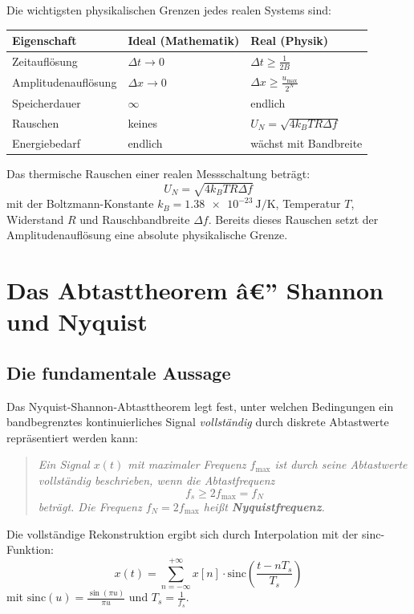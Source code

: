 ﻿\documentclass[12pt,a4paper,titlepage]{report}
\begin{document}
Die wichtigsten physikalischen Grenzen jedes realen Systems sind:

\begin{center}
\begin{tabular}{lll}
\toprule
\textbf{Eigenschaft} & \textbf{Ideal (Mathematik)} & \textbf{Real (Physik)} \\
\midrule
Zeitauflösung & $\Delta t \to 0$ & $\Delta t \geq \frac{1}{2B}$ \\
Amplitudenauflösung & $\Delta x \to 0$ & $\Delta x \geq \frac{u_{\max}}{2^N}$ \\
Speicherdauer & $\infty$ & endlich \\
Rauschen & keines & $U_N = \sqrt{4k_B T R \Delta f}$ \\
Energiebedarf & endlich & wächst mit Bandbreite \\
\bottomrule
\end{tabular}
\end{center}

Das thermische Rauschen einer realen Messschaltung beträgt:
\[
	U_N = \sqrt{4 k_B T R \Delta f}
\]
mit der Boltzmann-Konstante $k_B = \SI{1.38e-23}{\joule\per\kelvin}$, 
Temperatur $T$, Widerstand $R$ und Rauschbandbreite $\Delta f$.
Bereits dieses Rauschen setzt der Amplitudenauflösung eine absolute physikalische Grenze.

\chapter{Das Abtasttheorem â€” Shannon und Nyquist}

\section{Die fundamentale Aussage}

Das Nyquist-Shannon-Abtasttheorem legt fest, unter welchen Bedingungen 
ein bandbegrenztes kontinuierliches Signal \emph{vollständig} durch 
diskrete Abtastwerte repräsentiert werden kann:

\begin{quote}
\itshape
Ein Signal $x(t)$ mit maximaler Frequenz $f_{\max}$ 
ist durch seine Abtastwerte vollständig beschrieben, 
wenn die Abtastfrequenz
\[
	f_s \geq 2 f_{\max} = f_N
\]
beträgt. Die Frequenz $f_N = 2f_{\max}$ heißt \textbf{Nyquistfrequenz}.
\end{quote}

Die vollständige Rekonstruktion ergibt sich durch Interpolation mit der sinc-Funktion:
\[
	x(t) = \sum_{n=-\infty}^{+\infty} x[n] \cdot \mathrm{sinc}\!\left(\frac{t - nT_s}{T_s}\right)
\]
mit $\mathrm{sinc}(u) = \frac{\sin(\pi u)}{\pi u}$ und $T_s = \frac{1}{f_s}$.
\end{document}
